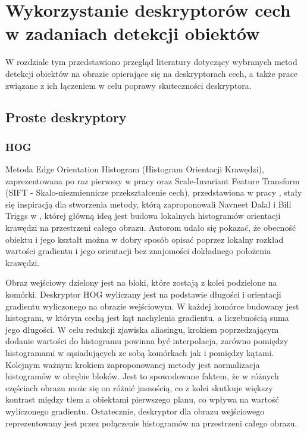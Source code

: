\chapter{Wykorzystanie deskryptorów cech w zadaniach detekcji obiektów}
\label{cha:prace}

W rozdziale tym przedstawiono przegląd literatury dotyczący wybranych metod detekcji obiektów na obrazie opierające się na deskryptorach cech, a także prace związane z ich łączeniem w celu poprawy skuteczności deskryptora.

\section{Proste deskryptory}
\label{sec:prosteDeskryptory}

\subsection{HOG}
Metoda Edge Orientation Histogram (Histogram Orientacji Krawędzi), zaprezentowana po raz pierwszy w pracy \cite{Freeman94} oraz Scale-Invariant Feature Transform (SIFT - Skalo-niezmiennicze przekształcenie cech), przedstawiona w pracy \cite{Lowe04}, stały się inspiracją dla stworzenia metody, którą zaproponowali Navneet Dalal i Bill Triggs w \cite{Dalal05}, której główną ideą jest budowa lokalnych histogramów orientacji krawędzi na przestrzeni całego obrazu. Autorom udało się pokazać, że obecność obiektu i jego kształt można w dobry sposób opisać poprzez lokalny rozkład wartości gradientu i jego orientacji bez znajomości dokładnego położenia krawędzi.

Obraz wejściowy dzielony jest na bloki, które zostają z kolei podzielone na komórki.
Deskryptor HOG wyliczany jest na podstawie długości i orientacji gradientu wyliczonego na obrazie wejściowym. W każdej komórce budowany jest histogram, w którym cechą jest kąt nachylenia gradientu, a liczebnością suma jego długości. W celu redukcji zjawiska aliasingu, krokiem poprzedzającym dodanie wartości do histogramu powinna być interpolacja, zarówno pomiędzy histogramami w sąsiadujących ze sobą komórkach jak i pomiędzy kątami. Kolejnym ważnym krokiem zaproponowanej metody jest normalizacja histogramów w obrębie bloków. Jest to spowodowane faktem, że w różnych częściach obrazu może się on różnić jasnością, co z kolei skutkuje większy kontrast między tłem a obiektami pierwszego planu, co wpływa na wartość wyliczonego gradientu.
Ostatecznie, deskryptor dla obrazu wejściowego reprezentowany jest przez połączenie histogramów na przestrzeni całego obrazu.

